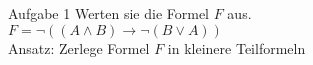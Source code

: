 \begin{frame}{Aufgabe 1}
	Werten sie die Formel $F$ aus.\\
	$F = \neg((A\wedge B)\rightarrow\neg(B\vee A))$\\
	Ansatz: Zerlege Formel $F$ in kleinere Teilformeln\\
\end{frame}
